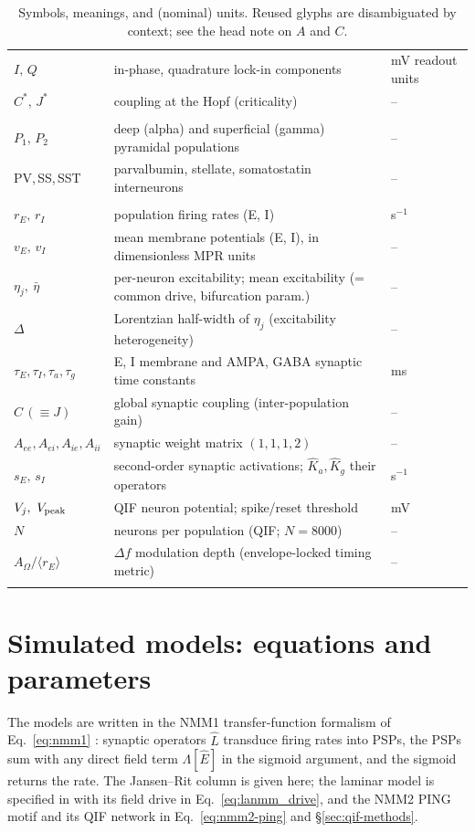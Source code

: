 \documentclass[11pt,a4paper]{article}
\providecommand{\DIFaddtex}[1]{{\protect\color{blue} \sf #1}} %
\providecommand{\DIFdeltex}[1]{{\protect\color{red} \scriptsize #1}} %
\providecommand{\DIFaddbegin}{} %
\providecommand{\DIFaddend}{} %
\providecommand{\DIFdelbegin}{} %
\providecommand{\DIFdelend}{} %
\providecommand{\DIFadd}[1]{\texorpdfstring{\DIFaddtex{#1}}{#1}} %
\providecommand{\DIFdel}[1]{\texorpdfstring{\DIFdeltex{#1}}{}} %
\begin{document}
{\begin{longtable}{@{}>{\raggedright\arraybackslash}p{} >{\raggedright\arraybackslash}p{} >{\raggedright\arraybackslash}p{}@{}}
$I,\,Q$ & in-phase, quadrature lock-in components & \DIFdelbegin \DIFdel{mV }\DIFdelend \DIFaddbegin \DIFadd{readout units }\DIFaddend \\
$C^{*},\,J^{*}$ & coupling at the Hopf (criticality) & -- \\
\midrule \multicolumn{3}{@{}l}{\textit{Laminar model (LaNMM)}} \\*
$P_1,\,P_2$ & deep (alpha) and superficial (gamma) pyramidal populations & -- \\
PV,\,SS,\,SST & parvalbumin, stellate, somatostatin interneurons & -- \\
\midrule \multicolumn{3}{@{}l}{\textit{Exact mean field (NMM2 / MPR) and QIF network}} \\*
$r_E,\,r_I$ & population firing rates (E, I) & s$^{-1}$ \\
$v_E,\,v_I$ & mean membrane potentials (E, I), in dimensionless MPR units & -- \\
$\eta_j,\ \bar\eta$ & per-neuron excitability; mean excitability (= common drive, bifurcation param.) & -- \\
$\Delta$ & Lorentzian half-width of $\eta_j$ (excitability heterogeneity) & -- \\
$\tau_E,\tau_I,\tau_a,\tau_g$ & E, I membrane and AMPA, GABA synaptic time constants & ms \\
$C\,(\equiv J)$ & global synaptic coupling (inter-population gain) & -- \\
$A_{ee},A_{ei},A_{ie},A_{ii}$ & synaptic weight matrix $(1,1,1,2)$ & -- \\
$s_E,\,s_I$ & second-order synaptic activations; $\hat K_a,\hat K_g$ their operators & s$^{-1}$ \\
$V_j,\ V_{\rm peak}$ & QIF neuron potential; spike/reset threshold & mV \\
$N$ & neurons per population (QIF; $N=8000$) & -- \\
$A_\Omega/\langle r_E\rangle$ & $\Delta f$ modulation depth (envelope-locked timing metric) & -- \\
\bottomrule
\caption{Symbols, meanings, and (nominal) units. Reused glyphs are disambiguated by
context; see the head note on $A$ and $C$.}\label{tab:notation}
\end{longtable}}

\section{Simulated models: equations and parameters}\label{app:models}
The models are written in the NMM1 transfer-function formalism of Eq.~\eqref{eq:nmm1}
\cite{ruffini2025rosetta}: synaptic operators $\hat L$ transduce firing rates into PSPs, the
PSPs sum with any direct field term $\Lambda[\hat E]$ in the sigmoid argument, and the sigmoid
returns the rate. The Jansen--Rit column is given here; the laminar model is specified in
\cite{ruffini2025cfc,sanchezTodo2023} with its field drive in Eq.~\eqref{eq:lanmm_drive}, and
the NMM2 PING motif and its QIF network in Eq.~\eqref{eq:nmm2-ping} and \S\ref{sec:qif-methods}.
\end{document}
